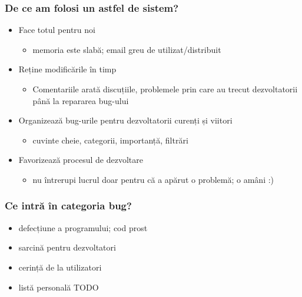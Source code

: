 \documentclass{beamer}
\begin{document}
\begin{frame}[allowframebreaks] %
\frametitle{De ce am folosi un astfel de sistem?}
\begin{itemize}
\item Face totul pentru noi
\begin{itemize}
\item memoria este slabă; email greu de utilizat/distribuit
\end{itemize}
\item Reține modificările în timp
\begin{itemize}
\item Comentariile arată discuțiile, problemele prin care au trecut dezvoltatorii până la repararea bug-ului
\end{itemize}
\item Organizează bug-urile pentru dezvoltatorii curenți și viitori
\begin{itemize}
\item cuvinte cheie, categorii, importanță, filtrări
\end{itemize}
\item Favorizează procesul de dezvoltare
\begin{itemize}
\item nu întrerupi lucrul doar pentru că a apărut o problemă; o amâni :)
\end{itemize}
\end{itemize}
\end{frame}

\begin{frame}
\frametitle{Ce intră în categoria bug?}
\begin{itemize}
\pause \item defecțiune a programului; cod prost
\pause \item sarcină pentru dezvoltatori
\pause \item cerință de la utilizatori
\pause \item listă personală TODO
\end{itemize}
\end{frame}
\end{document}
